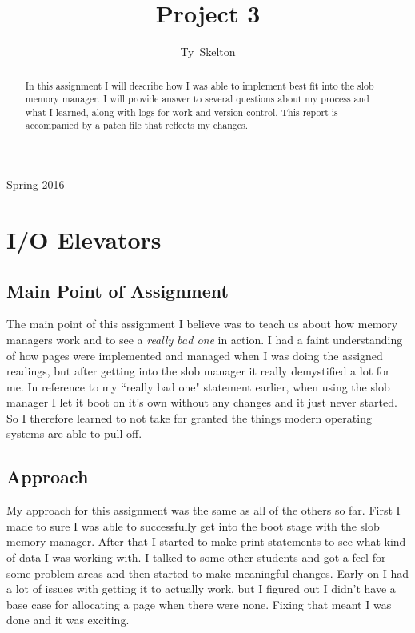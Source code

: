 \documentclass[10pt,draftclsnofoot,onecolumn]{IEEEtran}
\begin{document}
\singlespacing
\title{Project 3}

\author{Ty~Skelton}

%
{Spring 2016}

\maketitle

\begin{abstract}
In this assignment I will describe how I was able to implement best fit into the slob memory manager.
I will provide answer to several questions about my process and what I learned, along with logs for work and version control.
This report is accompanied by a patch file that reflects my changes.
\end{abstract}
\IEEEpeerreviewmaketitle

\newpage
{}

\tableofcontents
\newpage


\section{I/O Elevators}
\subsection{Main Point of Assignment}
The main point of this assignment I believe was to teach us about how memory managers work and to see a \textit{really bad one} in action.
I had a faint understanding of how pages were implemented and managed when I was doing the assigned readings, but after getting into the slob manager it really demystified a lot for me.
In reference to my ``really bad one" statement earlier, when using the slob manager I let it boot on it's own without any changes and it just never started.
So I therefore learned to not take for granted the things modern operating systems are able to pull off.

\subsection{Approach}
My approach for this assignment was the same as all of the others so far.
First I made to sure I was able to successfully get into the boot stage with the slob memory manager.
After that I started to make print statements to see what kind of data I was working with.
I talked to some other students and got a feel for some problem areas and then started to make meaningful changes.
Early on I had a lot of issues with getting it to actually work, but I figured out I didn't have a base case for allocating a page when there were none.
Fixing that meant I was done and it was exciting.
\end{document}
